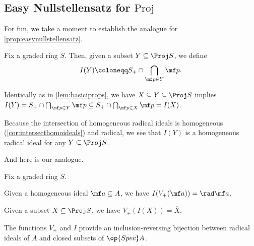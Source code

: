 \documentclass[../notes.tex]{subfiles}
\begin{document}
\subsection{Easy Nullstellensatz for \texorpdfstring{$\mathrm{Proj}$}{\textrm{Proj}}}
For fun, we take a moment to establish the analogue for \autoref{prop:easynullstellensatz}.
\begin{definition}
	Fix a graded ring $S$. Then, given a subset $Y\subseteq\Proj S$, we define
	\[I(Y)\coloneqq S_+\cap\bigcap_{\mf p\in Y}\mf p.\]
\end{definition}
\begin{remark} \label{rem:ireversecontain}
	Identically as in \autoref{lem:basiciprops}, we have $X\subseteq Y\subseteq\Proj S$ implies $I(Y)=S_+\cap\bigcap_{\mf p\in Y}\mf p\subseteq S_+\cap\bigcap_{\mf p\in X}\mf p=I(X)$.
\end{remark}
\begin{remark} \label{rem:iisradhomo}
	Because the intersection of homogeneous radical ideals is homogeneous (\autoref{cor:intersecthomoideals}) and radical, we see that $I(Y)$ is a homogeneous radical ideal for any $Y\subseteq\Proj S$.
\end{remark}
And here is our analogue.
\begin{proposition}
	Fix a graded ring $S$.
	\begin{listalph}
		\item Given a homogeneous ideal $\mf a\subseteq A$, we have $I(V_+(\mf a))=\rad\mf a$.
		\item Given a subset $X\subseteq\Proj S$, we have $V_+(I(X))=\overline X$.
		\item The functions $V_+$ and $I$ provide an inclusion-reversing bijection between radical ideals of $A$ and closed subsets of $\op{Spec}A$.
	\end{listalph}
\end{proposition}
\end{document}

